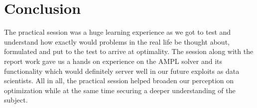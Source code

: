  \newpage
\section{Conclusion}
The practical session was a huge learning experience as we got to test and understand how exactly would problems in the real life be thought about, formulated and put to the test to arrive at optimality. The session along with the report work gave us a hands on experience on the AMPL solver and its functionality which would definitely server well in our future exploits as data scientists.  
All in all, the practical session helped broaden our perception on optimization while at the same time securing a deeper understanding of the subject.  

